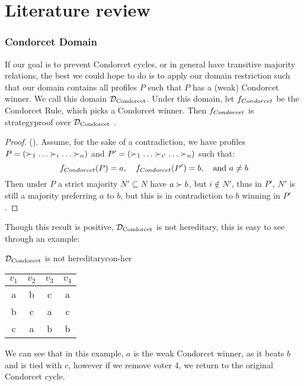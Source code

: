 \newpage
\chapter{Literature review}
\label{Literature}






\subsection{Condorcet Domain}
If our goal is to prevent Condorcet cycles, or in general have transitive majority relations, the best we could hope to do is to apply our domain restriction such that our domain contains all profiles $P$ such that $P$ has a (weak) Condorcet winner. We call this domain $\mathcal{D}_{\textnormal{Condorcet}}$. Under this domain, let $f_{\normalfont{Condorcet}}$ be the Condorcet Rule, which picks a Condorcet winner. Then $f_{\normalfont{Condorcet}}$ is strategyproof over $\mathcal{D}_{\textnormal{Condorcet}}$ \citep{elkindPreferenceRestrictionsComputational2022a}.

\begin{proof}{(\citet{elkindPreferenceRestrictionsComputational2022a})}.
	Assume, for the sake of a contradiction, we have profiles $P = (\pref_1 \dots \pref_i \dots \pref_n)$ and $P' = (\pref_1 \dots \pref_{i'} \dots \pref_n)$ such that:
	\[
		f_{\normalfont{Condorcet}}(P) = a, \quad f_{\normalfont{Condorcet}}(P') = b, \quad \text{and } a \neq b
	\]
	Then under $P$ a strict majority $N' \subseteq N$ have $a \succ b$, but $i \notin N'$, thus in $P'$, $N'$ is still a majority preferring $a$ to $b$, but this is in contradiction to $b$ winning in $P'$.
\end{proof}


Though this result is positive, $\mathcal{D}_{\textnormal{Condorcet}}$ is not hereditary, this is easy to see through an example:
\begin{example}{$\mathcal{D}_{\textnormal{Condorcet}}$ is not hereditary}{con-her}
	\begin{minipage}{0.25\linewidth}
		\begin{tabular}{cccc}
			\toprule
			$v_1$ & $v_2$ & $v_3$ & $v_4$ \\
			\midrule
			a     & b     & c     & a     \\
			b     & c     & a     & c     \\
			c     & a     & b     & b     \\
			\bottomrule
		\end{tabular}
	\end{minipage}
	\begin{minipage}[b]{0.70\linewidth}
		We can see that in this example, $a$ is the weak Condorcet winner, as it beats $b$ and is tied with $c$, however if we remove voter 4, we return to the original Condorcet cycle.
	\end{minipage}
\end{example}

